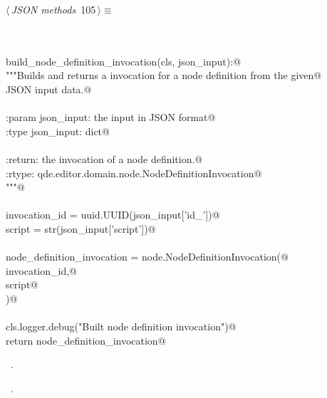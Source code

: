 \documentclass[
    a4paper,      %
    10pt,         %
    openright,    %
    notitlepage,  %
    parskip=half, %
]{scrreprt}       %
\theoremstyle{definition}                    %
\begin{document}
\begin{flushleft} \small
\begin{minipage}{\linewidth}\label{scrap171}\raggedright\small
{} $\langle\,${\itshape JSON methods}\nobreak\ {\footnotesize {105}}$\,\rangle\equiv$
\vspace{-1exm}
\begin{list}{}{} \item
\mbox{}\lstinline@@\\
\mbox{}\lstinline@classmethod@\\
\mbox{}\lstinline@def build_node_definition_invocation(cls, json_input):@\\
\mbox{}\lstinline@    """Builds and returns a invocation for a node definition from the given@\\
\mbox{}\lstinline@    JSON input data.@\\
\mbox{}\lstinline@@\\
\mbox{}\lstinline@    :param json_input: the input in JSON format@\\
\mbox{}\lstinline@    :type  json_input: dict@\\
\mbox{}\lstinline@@\\
\mbox{}\lstinline@    :return: the invocation of a node definition.@\\
\mbox{}\lstinline@    :rtype:  qde.editor.domain.node.NodeDefinitionInvocation@\\
\mbox{}\lstinline@    """@\\
\mbox{}\lstinline@@\\
\mbox{}\lstinline@    invocation_id = uuid.UUID(json_input['id_'])@\\
\mbox{}\lstinline@    script        = str(json_input['script'])@\\
\mbox{}\lstinline@@\\
\mbox{}\lstinline@    node_definition_invocation = node.NodeDefinitionInvocation(@\\
\mbox{}\lstinline@        invocation_id,@\\
\mbox{}\lstinline@        script@\\
\mbox{}\lstinline@    )@\\
\mbox{}\lstinline@@\\
\mbox{}\lstinline@    cls.logger.debug("Built node definition invocation")@\\
\mbox{}\lstinline@    return node_definition_invocation@\\
\mbox{}\lstinline@@{\NWsep}
\end{list}
\vspace{-1.5ex}
\footnotesize
\begin{list}{}{\setlength{\itemsep}{-\parsep}\setlength{\itemindent}{-\leftmargin}}
\item \NWtxtMacroDefBy\ .
\item \NWtxtMacroRefIn\ .


\end{list}
\end{minipage}
\end{flushleft}
\end{document}
